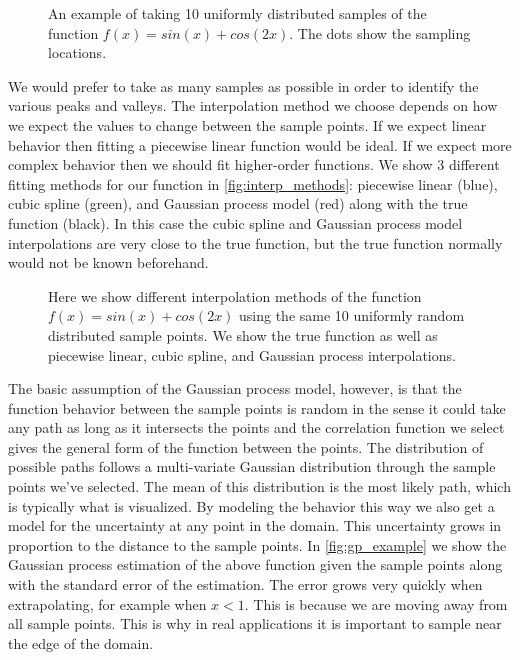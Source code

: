 \begin{figure}[htb]
  \centering
  
  \caption[The function $f(x) = sin(x) + cos(2x)$ uniformly sampled with 10 points]{%
    An example of taking 10 uniformly distributed samples of the function
    $f(x) = sin(x) + cos(2x)$.  The dots show the sampling locations.
  }
  \label{fig:reconstruction_sampling}
\end{figure}

We would prefer to take as many samples as possible in order to identify
the various peaks and valleys.
The interpolation method we choose depends on how we expect the values to
change between the sample points.
If we expect linear behavior then fitting a
piecewise linear function would be ideal.  If we expect more complex behavior
then we should fit higher-order functions.  We show 3 different fitting 
methods for our function in \autoref{fig:interp_methods}: piecewise linear (blue), 
cubic spline (green), and Gaussian process model (red) along with the true
function (black).  In this case the cubic spline and Gaussian process model
interpolations are very close to the true function, but the true function
normally would not be known beforehand.

\begin{figure}[htb]
  \centering
  
  \caption[Example of different interpretation methods]{%
    Here we show different interpolation methods of the function
    $f(x) = sin(x) + cos(2x)$ using the same 10 uniformly random distributed
    sample points.  We show the true function as well as piecewise linear,
    cubic spline, and Gaussian process interpolations.
  }
  \label{fig:interp_methods}
\end{figure}

The basic assumption of the Gaussian process model, however, is that the
function behavior between the sample points is random in the sense it could
take any path as long as it intersects the points and the correlation function
we select gives the general form of the function between the points.
The distribution of possible paths follows a multi-variate Gaussian
distribution through the sample points we've selected.  The mean of this 
distribution is the most likely path, which is typically what is visualized.
By modeling the behavior this way we also get a model for the uncertainty
at any point in the domain.  This uncertainty grows in proportion to the
distance to the sample points.  In \autoref{fig:gp_example} we show the Gaussian
process estimation of the above function given the sample points along with
the standard error of the estimation.  The error grows very quickly when
extrapolating, for example when $x < 1$.  This is 
because we are moving away from all sample points.  This is why in real 
applications it is important to sample near the edge of the domain.

